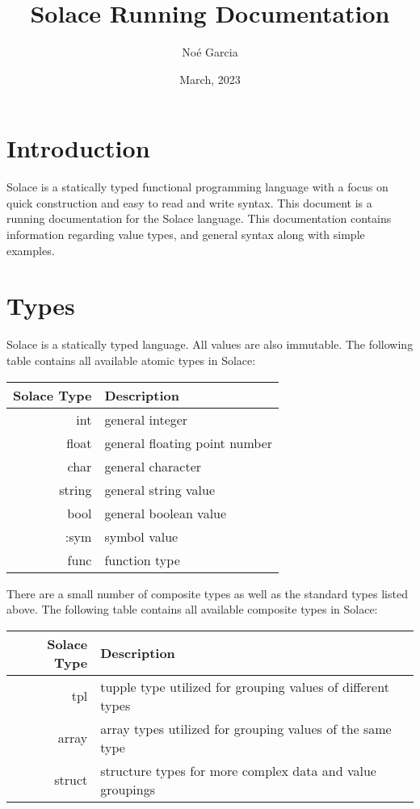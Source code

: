 \documentclass{article}
\title{
	\vspace{2in}
	\textmd{\textbf{Solace Running Documentation}}
	\vspace{3in}
}
\author{No\'e Garcia}
\date{March, 2023}
\begin{document}
\maketitle
\newpage

\section{Introduction}

Solace is a statically typed functional programming language with a focus on quick
construction and easy to read and write syntax.
This document is a running documentation for the Solace language. This documentation
contains information regarding value types, and general syntax along with simple examples.

\section{Types}

Solace is a statically typed language. All values are also immutable. The following table
contains all available atomic types in Solace:

\begin{center}
\begin{tabular}{|r|l|}
	\hline
	Solace Type & Description \\
	\hline
	\hline
	int & general integer \\
	float & general floating point number \\
	char & general character \\
	string & general string value \\
	bool & general boolean value \\
	:sym & symbol value \\
	func & function type \\
	\hline
\end{tabular}
\end{center}

There are a small number of composite types as well as the standard types listed above.
The following table contains all available composite types in Solace:

\begin{center}
\begin{tabular}{|r|l|}
	\hline
	Solace Type & Description \\
	\hline
	tpl & tupple type utilized for grouping values of different types \\
	array & array types utilized for grouping values of the same type \\
	struct & structure types for more complex data and value groupings \\
	\hline
\end{tabular}
\end{center}
\end{document}
